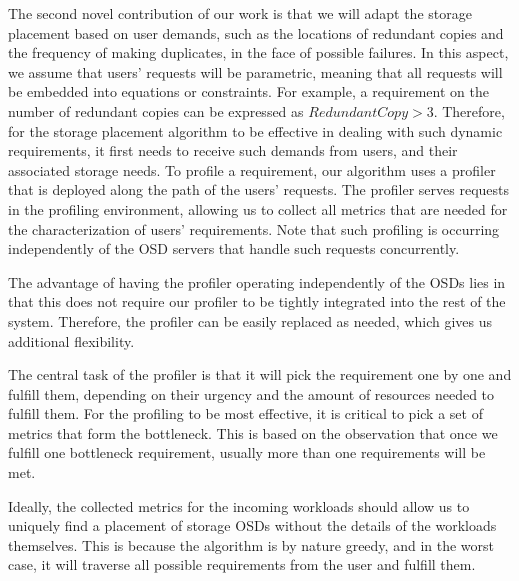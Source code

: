 The second novel contribution of our work is that we will adapt the storage placement based on user demands, such as the locations of redundant copies and the frequency of making duplicates, in the face of possible failures. In this aspect, we assume that users' requests will be parametric, meaning that all requests will be embedded into equations or constraints. For example, a requirement on the number of redundant copies can be expressed as $RedundantCopy > 3$.  Therefore, for the storage placement algorithm to be effective in dealing with such dynamic requirements, it first needs to receive such demands from users, and their associated storage needs. To profile a requirement, our algorithm uses a profiler that is deployed along the path of the users' requests. The profiler serves requests in the profiling environment, allowing us to collect all metrics that are needed for the characterization of users' requirements. Note that such profiling is occurring independently of the OSD servers that handle such requests concurrently.

The advantage of having the profiler operating independently of the OSDs lies in that this does not require our profiler to be tightly integrated into the rest of the system. Therefore, the profiler can be easily replaced as needed, which gives us additional flexibility.

The central task of the profiler is that it will pick the requirement one by one and fulfill them, depending on their urgency and the amount of resources needed to fulfill them. For the profiling to be most effective, it is critical to pick a set of metrics that form the bottleneck. This is based on the observation that once we fulfill one bottleneck requirement, usually more than one requirements will be met. 
 
Ideally, the collected metrics for the incoming workloads should allow us to uniquely find a placement of storage OSDs without the details of the workloads themselves. This is because the algorithm is by nature greedy, and in the worst case, it will traverse all possible requirements from the user and fulfill them. 
